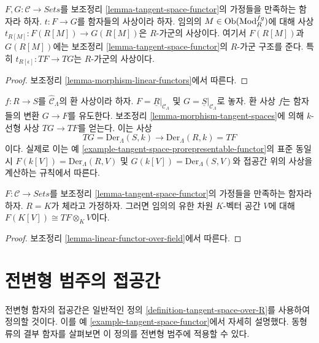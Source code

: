 \begin{lemma}
\label{lemma-morphism-tangent-spaces}
$F, G: \mathcal{C} \to \textit{Sets}$를 보조정리
\ref{lemma-tangent-space-functor}의 가정들을 만족하는 함자라 하자.
$t : F \to G$를 함자들의 사상이라 하자. 임의의
$M \in \mathop{\mathrm{Ob}}\nolimits(\text{Mod}^{fg}_R)$에 대해 사상
$t_{R[M]}: F(R[M]) \to G(R[M])$은 $R$-가군의 사상이다.
여기서 $F(R[M])$과 $G(R[M])$에는 보조정리
\ref{lemma-tangent-space-functor}의 $R$-가군 구조를 준다.
특히 $t_{R[\epsilon]} : TF \to TG$는 $R$-가군의 사상이다.
\end{lemma}

\begin{proof}
보조정리 \ref{lemma-morphism-linear-functors}에서 따른다.
\end{proof}

\begin{example}
\label{example-tangent-space-map-prorepresentable-functor}
$f : R \to S$를 $\widehat{\mathcal{C}}_\Lambda$의 환 사상이라 하자.
$F = \underline{R}|_{\mathcal{C}_\Lambda}$ 및
$G = \underline{S}|_{\mathcal{C}_\Lambda}$로 놓자.
환 사상 $f$는 함자들의 변환 $G \to F$를 유도한다.
보조정리 \ref{lemma-morphism-tangent-spaces}에 의해
$k$-선형 사상 $TG \to TF$를 얻는다. 이는 사상
$$
TG = \text{Der}_\Lambda(S, k) \longrightarrow \text{Der}_\Lambda(R, k) = TF
$$
이다. 실제로 이는 예
\ref{example-tangent-space-prorepresentable-functor}의 표준 동일시
$F(k[V]) = \text{Der}_\Lambda(R, V)$ 및
$G(k[V]) = \text{Der}_\Lambda(S, V)$와 접공간 위의 사상을 계산하는
규칙에서 따른다.
\end{example}

\begin{lemma}
\label{lemma-tangent-space-tensor}
$F: \mathcal{C} \to \textit{Sets}$를 보조정리
\ref{lemma-tangent-space-functor}의 가정들을 만족하는 함자라 하자.
$R = K$가 체라고 가정하자. 그러면 임의의 유한 차원
$K$-벡터 공간 $V$에 대해
$F(K[V]) \cong TF \otimes_K V$이다.
\end{lemma}

\begin{proof}
보조정리 \ref{lemma-linear-functor-over-field}에서 따른다.
\end{proof}

\section{전변형 범주의 접공간}
\label{section-tangent-spaces}

\noindent
전변형 함자의 접공간은 일반적인 정의
\ref{definition-tangent-space-over-R}를 사용하여 정의할 것이다.
이를 예 \ref{example-tangent-space-functor}에서 자세히 설명했다.
동형류의 결부 함자를 살펴보면 이 정의를 전변형 범주에 적용할 수 있다.

